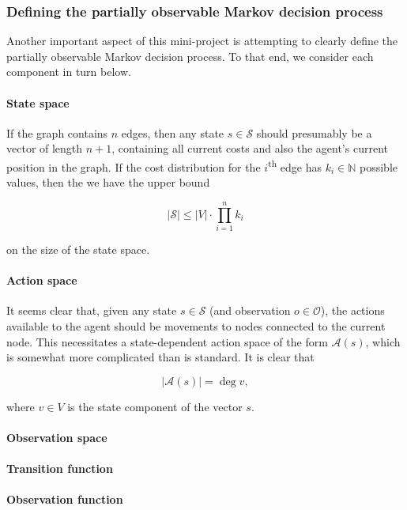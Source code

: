 \subsubsection{Defining the partially observable Markov decision process}

Another important aspect of this mini-project is attempting to clearly define the partially observable Markov decision process. To that end, we consider each component in turn below.

\paragraph{State space} If the graph contains $n$ edges, then any state $s \in \mathcal S$ should presumably be a vector of length $n + 1$, containing all current costs and also the agent's current position in the graph. If the cost distribution for the $i$\textsuperscript{th} edge has $k_i \in \mathbb N$ possible values, then the we have the upper bound

\[
    \lvert \mathcal S \rvert \leq \lvert V \rvert \cdot \prod_{i = 1}^n k_i
\]

on the size of the state space.

\paragraph{Action space} It seems clear that, given any state $s \in \mathcal S$ (and observation $o \in \mathcal O$), the actions available to the agent should be movements to nodes connected to the current node. This necessitates a state-dependent action space of the form $\mathcal A(s)$, which is somewhat more complicated than is standard. It is clear that

\[
    \lvert \mathcal A(s) \rvert = \deg v,
\]

where $v \in V$ is the state component of the vector $s$.

\paragraph{Observation space} 

\paragraph{Transition function} 

\paragraph{Observation function} 

